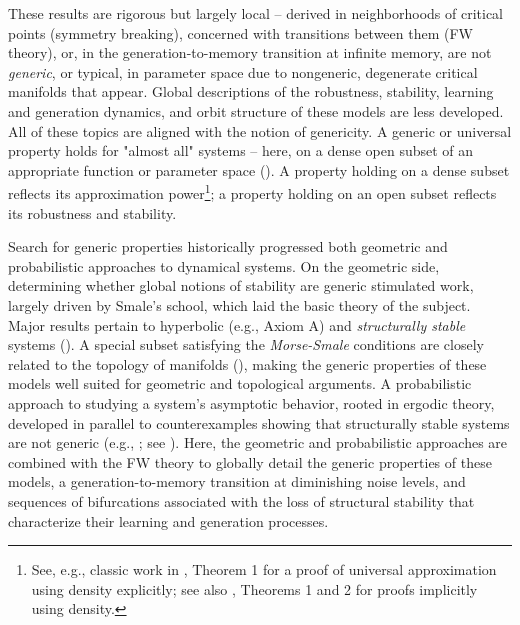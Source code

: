 \documentclass[12pt]{article}
\begin{document}
These results are rigorous but largely local -- derived in neighborhoods of critical points (symmetry breaking), concerned with transitions between them (FW theory), or, in the generation-to-memory transition at infinite memory, are not \textit{generic}, or typical, in parameter space due to nongeneric, degenerate critical manifolds that appear. Global descriptions of the robustness, stability, learning and generation dynamics, and orbit structure of these models are less developed. All of these topics are aligned with the notion of genericity. A generic or universal property holds for "almost all" systems --  here, on a dense open subset of an appropriate function or parameter space (). A property holding on a dense subset reflects its approximation power\footnote{See, e.g., classic work in \cite{cybenko1989approximation}, Theorem 1 for a proof of universal approximation using density explicitly; see also \cite{funahashi1989approximate}, Theorems 1 and 2 for proofs implicitly using density.}; a property holding on an open subset reflects its robustness and stability. 

Search for generic properties historically progressed both geometric and probabilistic approaches to dynamical systems. On the geometric side, determining whether global notions of stability are generic stimulated work, largely driven by Smale's school, which laid the basic theory of the subject. Major results pertain to hyperbolic (e.g., Axiom A) and \textit{structurally stable} systems (\cite{smale1967differentiable}). A special subset satisfying the \textit{Morse-Smale} conditions are closely related to the topology of manifolds (\cite{smale1960morse}), making the generic properties of these models well suited for geometric and topological arguments. A probabilistic approach to studying a system's asymptotic behavior, rooted in ergodic theory, developed in parallel to counterexamples showing that structurally stable systems are not generic (e.g., \cite{newhouse1970nondensity}; see \cite{palis2000global, palis2005global}). Here, the geometric and probabilistic approaches are combined with the FW theory to globally detail the generic properties of these models, a generation-to-memory transition at diminishing noise levels, and sequences of bifurcations associated with the loss of structural stability that characterize their learning and generation processes. 
\end{document}
